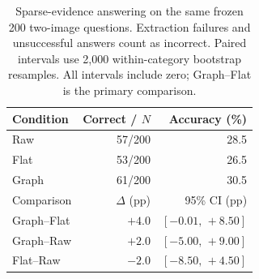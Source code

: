 \begin{table}[t]
  \centering
  \small
  \setlength{\tabcolsep}{4pt}
  \caption{Sparse-evidence answering on the same frozen 200 two-image
  questions. Extraction failures and unsuccessful answers count as incorrect.
  Paired intervals use 2,000 within-category bootstrap resamples.
  All intervals include zero; Graph--Flat is the primary comparison.}
  \label{tab:worldstate-main}
  \begin{tabular}{lrr}
    \toprule
    Condition & Correct / $N$ & Accuracy (\%) \\
    \midrule
    Raw   & 57/200 & 28.5 \\
    Flat  & 53/200 & 26.5 \\
    Graph & 61/200 & 30.5 \\
    \midrule
    Comparison & $\Delta$ (pp) & 95\% CI (pp) \\
    \midrule
    Graph--Flat & $+4.0$ & $[-0.01,\,+8.50]$ \\
    Graph--Raw  & $+2.0$ & $[-5.00,\,+9.00]$ \\
    Flat--Raw   & $-2.0$ & $[-8.50,\,+4.50]$ \\
    \bottomrule
  \end{tabular}
\end{table}
